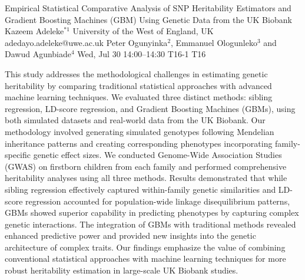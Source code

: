 \begin{talk}
  {Empirical Statistical Comparative Analysis of SNP Heritability Estimators and Gradient Boosting Machines (GBM) Using Genetic Data from the UK Biobank}%
  {Kazeem Adeleke$^{*1}$}%
  {University of the West of England, UK}%
  {adedayo.adeleke@uwe.ac.uk}%
  {Peter Ogunyinka$^{2}$, Emmanuel Ologunleko$^{3}$ and Dawud Agunbiade$^{4}$}%
  {}%
  {Wed, Jul 30 14:00–14:30}%
  {T16-1}%
  {T16}%
  
				
			
This study addresses the methodological challenges in estimating genetic heritability by comparing traditional statistical approaches with advanced machine learning techniques. We evaluated three distinct methods: sibling regression, LD-score regression, and Gradient Boosting Machines (GBMs), using both simulated datasets and real-world data from the UK Biobank. Our methodology involved generating simulated genotypes following Mendelian inheritance patterns and creating corresponding phenotypes incorporating family-specific genetic effect sizes. We conducted Genome-Wide Association Studies (GWAS) on firstborn children from each family and performed comprehensive heritability analyses using all three methods. Results demonstrated that while sibling regression effectively captured within-family genetic similarities and LD-score regression accounted for population-wide linkage disequilibrium patterns, GBMs showed superior capability in predicting phenotypes by capturing complex genetic interactions. The integration of GBMs with traditional methods revealed enhanced predictive power and provided new insights into the genetic architecture of complex traits. Our findings emphasize the value of combining conventional statistical approaches with machine learning techniques for more robust heritability estimation in large-scale UK Biobank studies.

\medskip


\end{talk}

